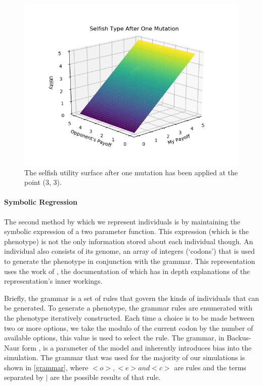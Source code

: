 \documentclass[11pt]{book}
\newcommand*{\np}{\par\noindent\newline}
\begin{document}
\begin{figure}
	\centering
	\includegraphics[scale=0.7]{resources/one_mutation.png}
	\caption{The selfish utility surface after one mutation has been applied at the point (3, 3).}
	\label{selfishUtilitySurfaceOneMutation}
\end{figure}

\paragraph{Symbolic Regression}
The second method by which we represent individuals is by maintaining the symbolic expression of a two parameter function.
This expression (which is the phenotype) is not the only information stored about each individual though.
An individual also consists of its genome, an array of integers (`codons') that is used to generate the phenotype in conjunction with the grammar.
This representation uses the work of \citet{fenton_ponyge2:_2017}, the documentation of which has in depth explanations of the representation's inner workings.

\np Briefly, the grammar is a set of rules that govern the kinds of individuals that can be generated.
To generate a phenotype, the grammar rules are enumerated with the phenotype iteratively constructed.
Each time a choice is to be made between two or more options, we take the modulo of the current codon by the number of available options, this value is used to select the rule.
The grammar, in Backus-Naur form \citep{oneill_grammatical_2001}, is a parameter of the model and inherently introduces bias into the simulation.
The grammar that was used for the majority of our simulations is shown in \ref{grammar}, where $<o>, <e> and <c>$ are rules and the terms separated by $|$ are the possible results of that rule.
\end{document}
